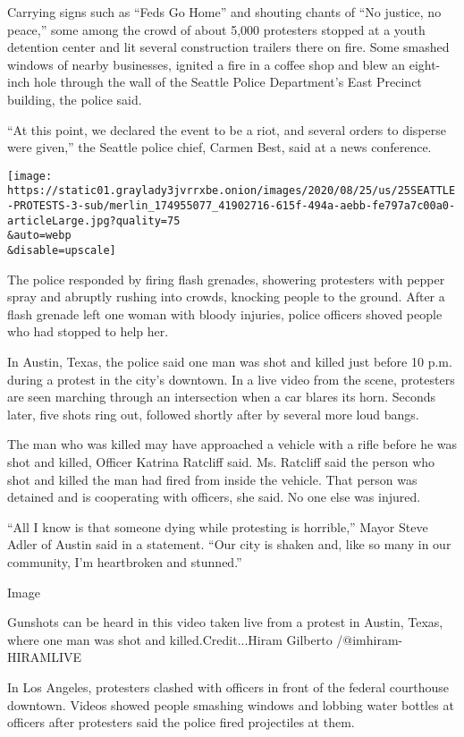 Carrying signs such as ``Feds Go Home'' and shouting chants of ``No
justice, no peace,'' some among the crowd of about 5,000 protesters
stopped at a youth detention center and lit several construction
trailers there on fire. Some smashed windows of nearby businesses,
ignited a fire in a coffee shop and blew an eight-inch hole through the
wall of the Seattle Police Department's East Precinct building, the
police said.

``At this point, we declared the event to be a riot, and several orders
to disperse were given,'' the Seattle police chief, Carmen Best, said at
a news conference.

\texttt{[image: https://static01.graylady3jvrrxbe.onion/images/2020/08/25/us/25SEATTLE-PROTESTS-3-sub/merlin\_174955077\_41902716-615f-494a-aebb-fe797a7c00a0-articleLarge.jpg?quality=75\\\&auto=webp\\\&disable=upscale]}

The police responded by firing flash grenades, showering protesters with
pepper spray and abruptly rushing into crowds, knocking people to the
ground. After a flash grenade left one woman with bloody injuries,
police officers shoved people who had stopped to help her.

In Austin, Texas, the police said one man was shot and killed just
before 10 p.m. during a protest in the city's downtown. In a live video
from the scene, protesters are seen marching through an intersection
when a car blares its horn. Seconds later, five shots ring out, followed
shortly after by several more loud bangs.

The man who was killed may have approached a vehicle with a rifle before
he was shot and killed, Officer Katrina Ratcliff said. Ms. Ratcliff said
the person who shot and killed the man had fired from inside the
vehicle. That person was detained and is cooperating with officers, she
said. No one else was injured.

``All I know is that someone dying while protesting is horrible,'' Mayor
Steve Adler of Austin said in a statement. ``Our city is shaken and,
like so many in our community, I'm heartbroken and stunned.''

Image

Gunshots can be heard in this video taken live from a protest in Austin,
Texas, where one man was shot and killed.Credit...Hiram Gilberto
/@imhiram-HIRAMLIVE

In Los Angeles, protesters clashed with officers in front of the federal
courthouse downtown. Videos showed people smashing windows and lobbing
water bottles at officers after protesters said the police fired
projectiles at them.

